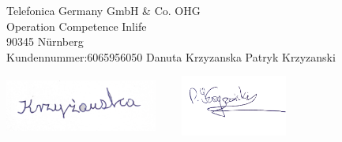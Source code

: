 \documentclass{letter} %
\begin{document}
\begin{letter}{Telefonica Germany GmbH & Co. OHG \\ Operation Competence Inlife \\ 90345 N\"urnberg \\ Kundennummer:6065956050}
Danuta Krzyzanska  Patryk Krzyzanski

\includegraphics[width=5cm, height=2cm]{podpisMama.png}
\includegraphics[width=5cm, height=2cm]{podpisPatryk.jpg}

\end{letter}
\end{document}
